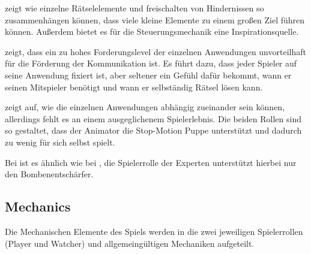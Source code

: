  zeigt wie einzelne Rätselelemente und freischalten von Hindernissen so zusammenhängen können, dass viele kleine Elemente zu einem großen Ziel führen können. Außerdem bietet es für die Steuerungsmechanik eine Inspirationsquelle. 

 zeigt, dass ein zu hohes Forderungslevel der einzelnen Anwendungen unvorteilhaft für die Förderung der Kommunikation ist. Es führt dazu, dass jeder Spieler auf seine Anwendung fixiert ist, aber seltener ein Gefühl dafür bekommt, wann er seinen Mitspieler benötigt und wann er selbständig Rätsel lösen kann. 

 zeigt auf, wie die einzelnen Anwendungen abhängig zueinander sein können, allerdings fehlt es an einem ausgeglichenem Spielerlebnis. Die beiden Rollen sind so gestaltet, dass der Animator die Stop-Motion Puppe unterstützt und dadurch zu wenig für sich selbst spielt. 

Bei  ist es ähnlich wie bei , die Spielerrolle der Experten unterstützt hierbei nur den Bombenentschärfer.





\subsection{Mechanics}
Die Mechanischen Elemente des Spiels werden in die zwei jeweiligen Spielerrollen (Player und Watcher) und allgemeingültigen Mechaniken aufgeteilt.

